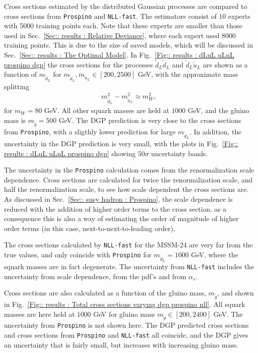 \documentclass[twoside,english]{uiofysmaster}
\begin{document}
Cross sections estimated by the distributed Gaussian processes are  compared to cross sections from \verb|Prospino| and \verb|NLL-fast|. The estimators consist of 10 experts with 5000 training points each. Note that these experts are smaller than those used in Sec.~\ref{Sec:: results : Relative Deviance}, where each expert used 8000 training points. This is due to the size of saved models, which will be discussed in Sec.~\ref{Sec:: results : The Optimal Model}. In Fig.~\ref{Fig:: results : dLuL uLuL prospino dgp} the cross sections for the processes $\widetilde{d}_L \widetilde{d}_L$ and $\widetilde{d}_L \widetilde{u}_L$ are shown as a function of $m_{\widetilde{d}_L}$ for $m_{\widetilde{d}_L}, m_{\widetilde{u}_L}\in[200, 2500]$ GeV, with the approximate mass splitting
\begin{align}
m_{\widetilde{d}_L}^2 - m_{\widetilde{u}_L}^2 \approx m_W^2,
\end{align}
for $m_W = 80$ GeV. All other squark masses are held at $1000$ GeV, and the gluino mass is $m_{\widetilde{g}} = 500$ GeV. The DGP prediction is very close to the cross sections from \verb|Prospino|, with a sligthly lower prediction for large $m_{\widetilde{d}_L}$. In addition, the uncertainty in the DGP prediction is very small, with the plots in Fig.~\ref{Fig:: results : dLuL uLuL prospino dgp} showing $50 \sigma$ uncertainty bands.

The uncertainty in the \verb|Prospino| calculation comes from the renormalization scale dependence. Cross sections are calculated for twice the renormalization scale, and half the renormalization scale, to see how scale dependent the cross sections are. As discussed in Sec.~\ref{Sec:: susy hadron : Prospino}, the scale dependence is reduced with the addition of higher order terms to the cross section, as a consequence this is also a way of estimating the order of magnitude of higher order terms (in this case, next-to-next-to-leading order).

The cross sections calculated by \verb|NLL-fast| for the MSSM-24 are very far from the true values, and only coincide with \verb|Prospino| for $m_{\widetilde{d}_L}=1000$ GeV, where the squark masses are in fact degenerate. The uncertainty from \verb|NLL-fast| includes the uncertainty from scale dependence, from the pdf's and from $\alpha_s$.

Cross sections are also calculated as a function of the gluino mass, $m_{\widetilde{g}}$, and shown in Fig.~\ref{Fig:: results : Total cross sections varymg dgp prospino nll}. All squark masses are here held at $1000$ GeV for gluino mass $m_{\widetilde{g}} \in [200, 2400]$ GeV. The uncertainty from \verb|Prospino| is not shown here. The DGP predicted cross sections and cross sections from \verb|Prospino| and \verb|NLL-fast| all coincide, and the DGP gives an uncertainty that is fairly small, but increases with increasing gluino mass. 
\end{document}
